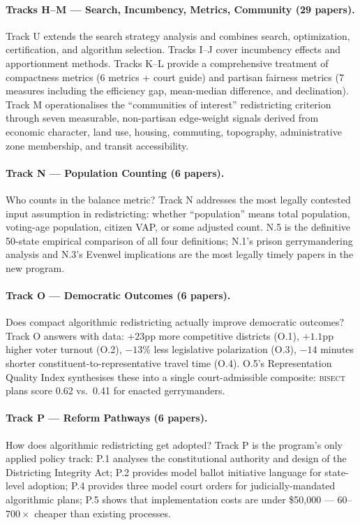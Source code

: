 \paragraph{Tracks H--M --- Search, Incumbency, Metrics, Community (29 papers).}
Track U extends the search strategy analysis and combines search, optimization,
certification, and algorithm selection.
Tracks I--J cover incumbency effects and apportionment methods.
Tracks K--L provide a comprehensive treatment of compactness metrics
(6 metrics + court guide) and partisan fairness metrics (7 measures including
the efficiency gap, mean-median difference, and declination).
Track M operationalises the ``communities of interest'' redistricting criterion
through seven measurable, non-partisan edge-weight signals derived from
economic character, land use, housing, commuting, topography, administrative
zone membership, and transit accessibility.

\paragraph{Track N --- Population Counting (6 papers).}
Who counts in the balance metric?
Track N addresses the most legally contested input assumption in redistricting:
whether ``population'' means total population, voting-age population, citizen VAP,
or some adjusted count.
N.5 is the definitive 50-state empirical comparison of all four definitions;
N.1's prison gerrymandering analysis and N.3's Evenwel implications are
the most legally timely papers in the new program.

\paragraph{Track O --- Democratic Outcomes (6 papers).}
Does compact algorithmic redistricting actually improve democratic outcomes?
Track O answers with data:
$+23$pp more competitive districts (O.1),
$+1.1$pp higher voter turnout (O.2),
$-13$\% less legislative polarization (O.3),
$-14$ minutes shorter constituent-to-representative travel time (O.4).
O.5's Representation Quality Index synthesises these into a single
court-admissible composite: \textsc{bisect} plans score 0.62 vs.\
0.41 for enacted gerrymanders.

\paragraph{Track P --- Reform Pathways (6 papers).}
How does algorithmic redistricting get adopted?
Track P is the program's only applied policy track:
P.1 analyses the constitutional authority and design of the Districting Integrity Act;
P.2 provides model ballot initiative language for state-level adoption;
P.4 provides three model court orders for judicially-mandated algorithmic plans;
P.5 shows that implementation costs are under \$50{,}000 --- $60$--$700\times$
cheaper than existing processes.

